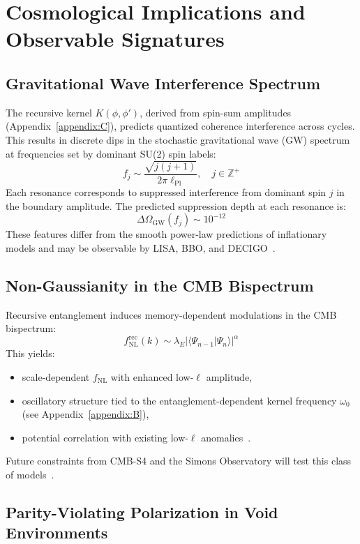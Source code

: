\section{Cosmological Implications and Observable Signatures}
\label{sec:cosmological-implications}

\subsection{Gravitational Wave Interference Spectrum}

The recursive kernel \( K(\phi, \phi') \), derived from spin-sum amplitudes (Appendix~\ref{appendix:C}), predicts quantized coherence interference across cycles. This results in discrete dips in the stochastic gravitational wave (GW) spectrum at frequencies set by dominant SU(2) spin labels:
\[
f_j \sim \frac{\sqrt{j(j+1)}}{2\pi \ell_{\text{Pl}}}, \quad j \in \mathbb{Z}^+
\]
Each resonance corresponds to suppressed interference from dominant spin \( j \) in the boundary amplitude. The predicted suppression depth at each resonance is:
\[
\Delta \Omega_{\text{GW}}(f_j) \sim 10^{-12}
\]
These features differ from the smooth power-law predictions of inflationary models and may be observable by LISA, BBO, and DECIGO~\cite{maggiore_gravitational_2000, smith_gravitational_2006}.

\subsection{Non-Gaussianity in the CMB Bispectrum}

Recursive entanglement induces memory-dependent modulations in the CMB bispectrum:
\[
f_{\text{NL}}^{\text{rec}}(k) \sim \lambda_E |\langle \Psi_{n-1} | \Psi_n \rangle|^\alpha
\]
This yields:
\begin{itemize}
    \item scale-dependent \( f_{\text{NL}} \) with enhanced low-\( \ell \) amplitude,
    \item oscillatory structure tied to the entanglement-dependent kernel frequency \( \omega_0 \) (see Appendix~\ref{appendix:B}),
    \item potential correlation with existing low-\( \ell \) anomalies~\cite{planck2019inflation}.
\end{itemize}
Future constraints from CMB-S4 and the Simons Observatory will test this class of models~\cite{cmbs4forecast2019}.

\subsection{Parity-Violating Polarization in Void Environments}

